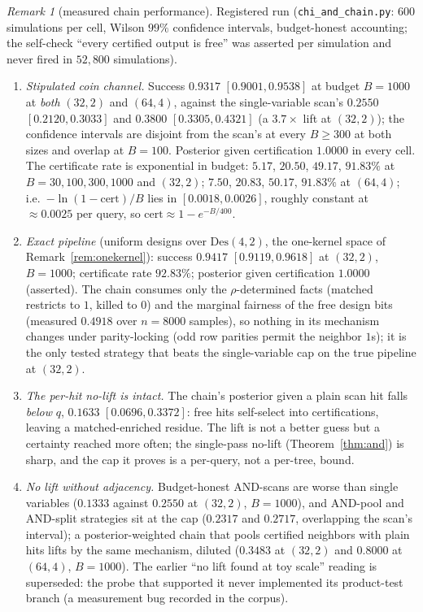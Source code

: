 \documentclass[11pt]{article}
\theoremstyle{definition}
\theoremstyle{remark}
\newtheorem{remark}[theorem]{Remark}
\newcommand{\Des}{\mathrm{Des}}
\begin{document}
\begin{remark}[measured chain performance]\label{rem:chainmeasured}
Registered run (\texttt{chi\_and\_chain.py}: $600$ simulations per
cell, Wilson $99\%$ confidence intervals, budget-honest accounting;
the self-check ``every certified output is free'' was asserted per
simulation and never fired in $52{,}800$ simulations).
\begin{enumerate}
\item \emph{Stipulated coin channel.}  Success $0.9317$
$[0.9001,0.9538]$ at budget $B=1000$ at \emph{both} $(32,2)$ and
$(64,4)$, against the single-variable scan's $0.2550$
$[0.2120,0.3033]$ and $0.3800$ $[0.3305,0.4321]$ (a $3.7\times$ lift
at $(32,2)$); the confidence intervals are disjoint from the scan's at
every $B\ge300$ at both sizes and overlap at $B=100$.  Posterior given
certification $1.0000$ in every cell.  The certificate rate is
exponential in budget: $5.17$, $20.50$, $49.17$, $91.83\%$ at
$B=30,100,300,1000$ and $(32,2)$; $7.50$, $20.83$, $50.17$,
$91.83\%$ at $(64,4)$; i.e.\ $-\ln(1-\mathrm{cert})/B$ lies in
$[0.0018,0.0026]$, roughly constant at $\approx0.0025$ per query, so
$\mathrm{cert}\approx1-e^{-B/400}$.
\item \emph{Exact pipeline} (uniform designs over $\Des(4,2)$, the
one-kernel space of Remark~\ref{rem:onekernel}): success $0.9417$
$[0.9119,0.9618]$ at $(32,2)$, $B=1000$; certificate rate $92.83\%$;
posterior given certification $1.0000$ (asserted).  The chain consumes
only the $\rho$-determined facts (matched restricts to $1$, killed to
$0$) and the marginal fairness of the free design bits (measured
$0.4918$ over $n=8000$ samples), so nothing in its mechanism changes
under parity-locking (odd row parities permit the neighbor $1$s); it
is the only tested strategy that beats the single-variable cap on the
true pipeline at $(32,2)$.
\item \emph{The per-hit no-lift is intact.}  The chain's posterior
given a plain scan hit falls \emph{below} $q$, $0.1633$
$[0.0696,0.3372]$: free hits self-select into certifications,
leaving a matched-enriched residue.  The lift is not a better guess
but a certainty reached more often; the single-pass no-lift
(Theorem~\ref{thm:and}) is sharp, and the cap it proves is a
per-query, not a per-tree, bound.
\item \emph{No lift without adjacency.}  Budget-honest AND-scans are
worse than single variables ($0.1333$ against $0.2550$ at $(32,2)$,
$B=1000$), and AND-pool and AND-split strategies sit at the cap
($0.2317$ and $0.2717$, overlapping the scan's interval); a
posterior-weighted chain that pools certified neighbors with plain
hits lifts by the same mechanism, diluted ($0.3483$ at $(32,2)$ and
$0.8000$ at $(64,4)$, $B=1000$).  The earlier ``no lift found at toy
scale'' reading is superseded: the probe that supported it never
implemented its product-test branch (a measurement bug recorded in
the corpus).
\end{enumerate}
\end{remark}
\end{document}
